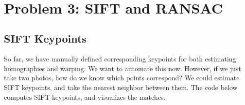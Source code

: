 \documentclass[11pt]{article}
\begin{document}
    \begin{center}
    \end{center}
    { \hspace*{\fill} \\}
    
    \section{Problem 3: SIFT and RANSAC}\label{problem-3-sift-and-ransac}

\subsection{SIFT Keypoints}\label{sift-keypoints}

So far, we have manually defined corresponding keypoints for both
estimating homographies and warping. We want to automate this now.
However, if we just take two photos, how do we know which points
correspond? We could estimate SIFT keypoints, and take the nearest
neighbor between them. The code below computes SIFT keypoints, and
visualizes the matches.
\end{document}
